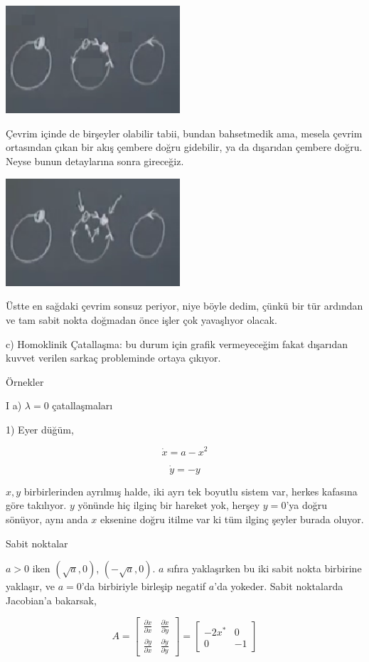 \documentclass[12pt,fleqn]{article}\usepackage{../../common}
\begin{document}
\includegraphics[height=4cm]{12_09.png}

Çevrim içinde de birşeyler olabilir tabii, bundan bahsetmedik ama, mesela çevrim
ortasından çıkan bir akış çembere doğru gidebilir, ya da dışarıdan çembere
doğru. Neyse bunun detaylarına sonra gireceğiz.

\includegraphics[height=4cm]{12_10.png}

Üstte en sağdaki çevrim sonsuz periyor, niye böyle dedim, çünkü bir tür ardından
ve tam sabit nokta doğmadan önce işler çok yavaşlıyor olacak.

c) Homoklinik Çatallaşma: bu durum için grafik vermeyeceğim fakat dışarıdan
kuvvet verilen sarkaç probleminde ortaya çıkıyor.

Örnekler

I a) $\lambda=0$ çatallaşmaları

1) Eyer düğüm,

$$\dot{x} = a - x^2$$

$$\dot{y} = -y $$

$x,y$ birbirlerinden ayrılmış halde, iki ayrı tek boyutlu sistem var, herkes
kafasına göre takılıyor. $y$ yönünde hiç ilginç bir hareket yok, herşey $y=0$'ya
doğru sönüyor, aynı anda $x$ eksenine doğru itilme var ki tüm ilginç şeyler
burada oluyor. 

Sabit noktalar

$a>0$ iken $(\sqrt{a},0)$, $(-\sqrt{a},0)$. $a$ sıfıra yaklaşırken bu iki sabit
nokta birbirine yaklaşır, ve $a=0$'da birbiriyle birleşip negatif $a$'da
yokeder. Sabit noktalarda Jacobian'a bakarsak,

$$
A =
\left[\begin{array}{rrr}
\frac{\partial \dot{x}}{\partial x} & \frac{\partial \dot{x}}{\partial y}  \\
\frac{\partial \dot{y}}{\partial x} & \frac{\partial \dot{y}}{\partial y} 
\end{array}\right] =
\left[\begin{array}{rrr}
-2x^* & 0  \\ 0 & -1
\end{array}\right] 
$$
\end{document}

